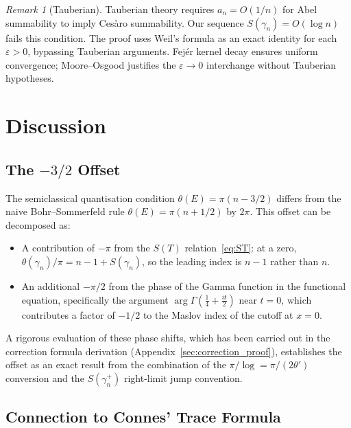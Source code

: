 \documentclass{pre-aomart}
\theoremstyle{plain}
\theoremstyle{definition}
\theoremstyle{remark}
\newtheorem{remark}[theorem]{Remark}
\begin{document}
\begin{remark}[Tauberian]
Tauberian theory requires $a_n = O(1/n)$ for Abel summability
to imply Ces\`aro summability.  Our sequence $S(\gamma_n) = O(\log n)$
fails this condition.  The proof uses Weil's formula as an exact
identity for each $\varepsilon > 0$, bypassing Tauberian arguments.
Fej\'er kernel decay ensures uniform convergence; Moore--Osgood
justifies the $\varepsilon \to 0$ interchange without Tauberian hypotheses.
\end{remark}

\section{Discussion}
\label{sec:discussion}

\subsection{The \texorpdfstring{$-3/2$}{-3/2} Offset}

The semiclassical quantisation condition $\theta(E) = \pi(n - 3/2)$ differs from the naive
Bohr--Sommerfeld rule $\theta(E) = \pi(n + 1/2)$ by $2\pi$.  This offset can be decomposed as:
\begin{itemize}
\item A contribution of $-\pi$ from the $S(T)$ relation~\eqref{eq:ST}: at a zero,
  $\theta(\gamma_n)/\pi = n - 1 + S(\gamma_n)$, so the leading index is $n-1$ rather
  than $n$.
\item An additional $-\pi/2$ from the phase of the Gamma function in the functional
  equation, specifically the argument $\arg\Gamma(\frac{1}{4} + \frac{it}{2})$ near $t=0$,
  which contributes a factor of $-1/2$ to the Maslov index of the cutoff at $x=0$.
\end{itemize}
A rigorous evaluation of these phase shifts, which has been carried out
in the correction formula derivation (Appendix~\ref{sec:correction_proof}),
establishes the offset as an exact result from the combination of the
$\pi/\log = \pi/(2\theta')$ conversion and the $S(\gamma_n^+)$ right-limit
jump convention.

\subsection{Connection to Connes' Trace Formula}
\end{document}
